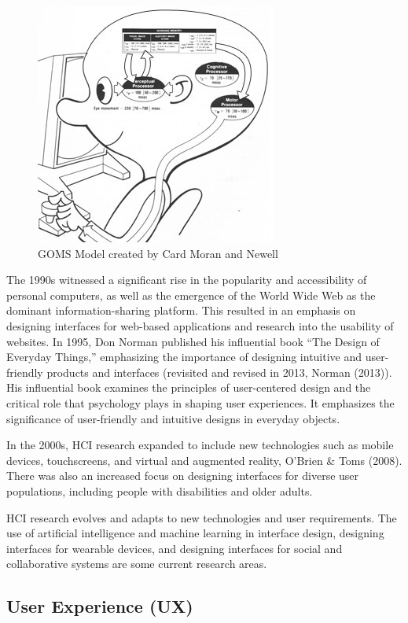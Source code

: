 \documentclass[print]{nuthesis}
\begin{document}
\begin{figure}

{\centering \includegraphics[width=0.45\linewidth]{figure/goms_model} 

}

\caption{GOMS Model created by Card Moran and Newell}\label{fig:gomsmodel}
\end{figure}

The 1990s witnessed a significant rise in the popularity and accessibility of personal computers, as well as the emergence of the World Wide Web as the dominant information-sharing platform.
This resulted in an emphasis on designing interfaces for web-based applications and research into the usability of websites.
In 1995, Don Norman published his influential book ``The Design of Everyday Things,'' emphasizing the importance of designing intuitive and user-friendly products and interfaces (revisited and revised in 2013, Norman (2013)).
His influential book examines the principles of user-centered design and the critical role that psychology plays in shaping user experiences.
It emphasizes the significance of user-friendly and intuitive designs in everyday objects.

In the 2000s, HCI research expanded to include new technologies such as mobile devices, touchscreens, and virtual and augmented reality, O'Brien \& Toms (2008).
There was also an increased focus on designing interfaces for diverse user populations, including people with disabilities and older adults.

HCI research evolves and adapts to new technologies and user requirements.
The use of artificial intelligence and machine learning in interface design, designing interfaces for wearable devices, and designing interfaces for social and collaborative systems are some current research areas.

\hypertarget{user-experience-ux}{%
\subsection{User Experience (UX)}\label{user-experience-ux}}
\end{document}
